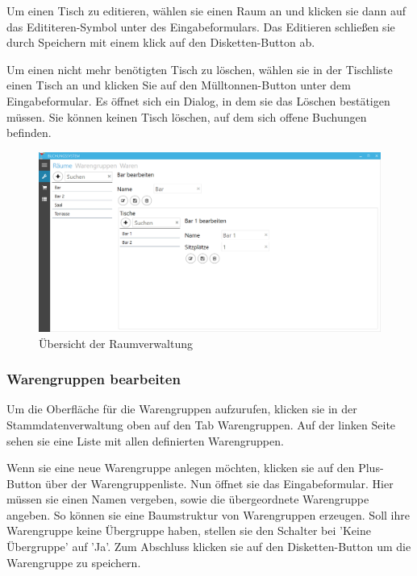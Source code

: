 Um einen Tisch zu editieren, wählen sie einen Raum an und klicken sie dann auf das Edititeren-Symbol unter des Eingabeformulars. Das Editieren schließen sie durch Speichern mit einem klick auf den Disketten-Button ab.

Um einen nicht mehr benötigten Tisch zu löschen, wählen sie in der Tischliste einen Tisch an und klicken Sie auf den Mülltonnen-Button unter dem Eingabeformular. Es öffnet sich ein Dialog, in dem sie das Löschen bestätigen müssen. Sie können keinen Tisch löschen, auf dem sich offene Buchungen befinden.

\begin{figure}[h]
	\begin{center}
		\includegraphics[width=\columnwidth]{Benutzerhandbuch/Raumverwaltung.png}
	\end{center}
	\caption{Übersicht der Raumverwaltung}
	\label{fig:room-management}
\end{figure}

\subsubsection{Warengruppen bearbeiten}

Um die Oberfläche für die Warengruppen aufzurufen, klicken sie in der Stammdatenverwaltung oben auf den Tab Warengruppen. Auf der linken Seite sehen sie eine Liste mit allen definierten Warengruppen. 

Wenn sie eine neue Warengruppe anlegen möchten, klicken sie auf den Plus-Button über der Warengruppenliste. 
Nun öffnet sie das Eingabeformular. Hier müssen sie einen Namen vergeben, sowie die übergeordnete Warengruppe angeben. 
So können sie eine Baumstruktur von Warengruppen erzeugen. 
Soll ihre Warengruppe keine Übergruppe haben, stellen sie den Schalter bei 'Keine Übergruppe' auf 'Ja'. Zum Abschluss klicken sie auf den Disketten-Button um die Warengruppe zu speichern.

